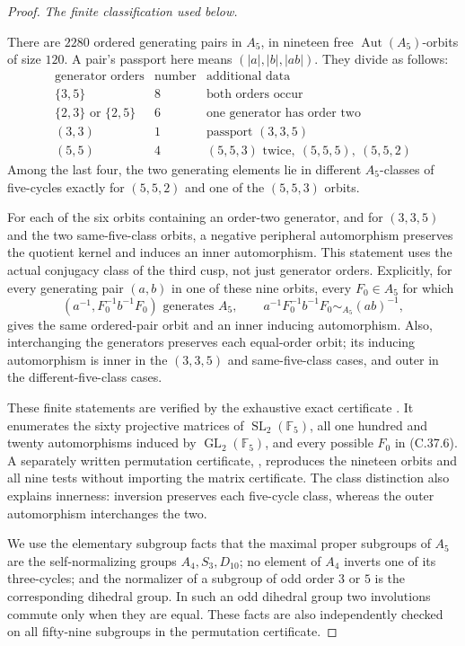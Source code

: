 \begin{proof}
\emph{The finite classification used below.}\par
There are \(2280\) ordered generating pairs in \(A_5\),
in nineteen free \(\operatorname{Aut}(A_5)\)-orbits of
size \(120\). A pair's passport here means
\((|a|,|b|,|ab|)\). They divide as follows:
\[
\begin{array}{c|c|l}
\text{generator orders}&\text{number}&\text{additional data}\\ \hline
\{3,5\}&8&\text{both orders occur}\\
\{2,3\}\text{ or }\{2,5\}&6&\text{one generator has order two}\\
(3,3)&1&\text{passport }(3,3,5)\\
(5,5)&4& (5,5,3)\text{ twice},\ (5,5,5),\ (5,5,2)
\end{array}
\tag{C.37.5}
\]
Among the last four, the two generating elements lie in different
\(A_5\)-classes of five-cycles exactly for \((5,5,2)\)
and one of the \((5,5,3)\) orbits.

For each of the six orbits containing an order-two generator,
and for \((3,3,5)\) and the two same-five-class orbits,
a negative peripheral automorphism preserves the quotient
kernel and induces an inner automorphism. This statement uses
the actual conjugacy class of the third cusp, not just generator
orders. Explicitly, for every generating pair \((a,b)\)
in one of these nine orbits, every \(F_0\in A_5\) for
which
\[
 (a^{-1},F_0^{-1}b^{-1}F_0)\text{ generates }A_5,
 \qquad
 a^{-1}F_0^{-1}b^{-1}F_0\sim_{A_5}(ab)^{-1},
 \tag{C.37.6}
\]
gives the same ordered-pair orbit and an inner inducing
automorphism. Also, interchanging the generators preserves
each equal-order orbit; its inducing automorphism is inner
in the \((3,3,5)\) and same-five-class cases, and outer in
the different-five-class cases.

These finite statements are verified by the exhaustive exact
certificate .
It enumerates the sixty projective matrices of
\(\operatorname{SL}_2(\mathbb F_5)\), all one hundred and
twenty automorphisms induced by \(\operatorname{GL}_2(\mathbb F_5)\),
and every possible \(F_0\) in (C.37.6). A separately written
permutation certificate, ,
reproduces the nineteen orbits and all nine tests without importing
the matrix certificate. The class distinction also explains
innerness: inversion preserves each five-cycle class, whereas
the outer automorphism interchanges the two.

We use the elementary subgroup facts that the maximal proper
subgroups of \(A_5\) are the self-normalizing groups
\(A_4,S_3,D_{10}\); no element of \(A_4\) inverts one
of its three-cycles; and the normalizer of a subgroup of odd
order \(3\) or \(5\) is the corresponding dihedral
group. In such an odd dihedral group two involutions commute
only when they are equal. These facts are also independently
checked on all fifty-nine subgroups in the permutation certificate.


\end{proof}
